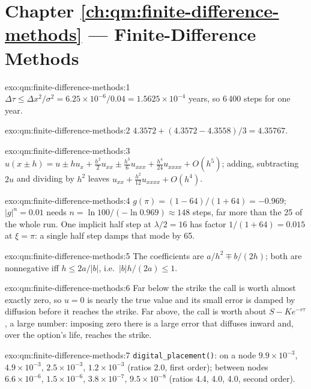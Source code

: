 \section*{Chapter \ref{ch:qm:finite-difference-methods} --- Finite-Difference Methods}

\begin{solution}{exo:qm:finite-difference-methods:1}
$\Delta\tau \le \Delta x^2/\sigma^2 = 6.25 \times 10^{-6}/0.04 = 1.5625 \times 10^{-4}$ years, so 6\,400 steps for one year.
\end{solution}

\begin{solution}{exo:qm:finite-difference-methods:2}
$4.3572 + (4.3572 - 4.3558)/3 = 4.35767$.
\end{solution}

\begin{solution}{exo:qm:finite-difference-methods:3}
$u(x \pm h) = u \pm hu_x + \frac{h^2}{2}u_{xx} \pm \frac{h^3}{6}u_{xxx} + \frac{h^4}{24}u_{xxxx} + O(h^5)$; adding, subtracting $2u$ and dividing by $h^2$ leaves $u_{xx} + \frac{h^2}{12}u_{xxxx} + O(h^4)$.
\end{solution}

\begin{solution}{exo:qm:finite-difference-methods:4}
$g(\pi) = (1 - 64)/(1 + 64) = -0.969$; $|g|^n = 0.01$ needs $n = \ln100/(-\ln0.969) \approx 148$ steps, far more than the 25 of the whole run. One implicit half step at $\lambda/2 = 16$ has factor $1/(1 + 64) =
0.015$ at $\xi = \pi$: a single half step damps that mode by 65.
\end{solution}

\begin{solution}{exo:qm:finite-difference-methods:5}
The coefficients are $a/h^2 \mp b/(2h)$; both are nonnegative iff $h \le 2a/|b|$, i.e.\ $|b|h/(2a) \le 1$.
\end{solution}

\begin{solution}{exo:qm:finite-difference-methods:6}
Far below the strike the call is worth almost exactly zero, so $u = 0$ is nearly the true value and its small error is damped by diffusion before it reaches the strike. Far above, the call is worth
about $S - Ke^{-r\tau}$, a large number: imposing zero there is a large error that diffuses inward and, over the option's life, reaches the strike.
\end{solution}

\begin{solution}{exo:qm:finite-difference-methods:7}
\texttt{digital\_placement()}: on a node $9.9 \times 10^{-3}$, $4.9 \times 10^{-3}$, $2.5 \times 10^{-3}$, $1.2 \times 10^{-3}$ (ratios 2.0, first order); between nodes $6.6 \times 10^{-6}$, $1.5 \times 10^{-6}$,
$3.8 \times 10^{-7}$, $9.5 \times 10^{-8}$ (ratios 4.4, 4.0, 4.0, second order).
\end{solution}


